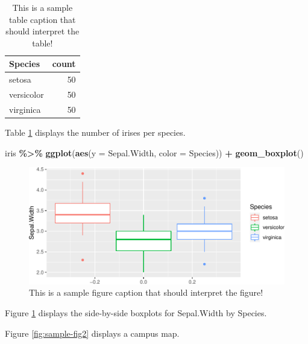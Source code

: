 \documentclass[12pt]{article}
\newenvironment{Shaded}{\begin{snugshade}}{\end{snugshade}}
\newcommand{\AttributeTok}[1]{\textcolor[rgb]{0.13,0.29,0.53}{#1}}
\newcommand{\FunctionTok}[1]{\textcolor[rgb]{0.13,0.29,0.53}{\textbf{#1}}}
\newcommand{\NormalTok}[1]{#1}
\newcommand{\SpecialCharTok}[1]{\textcolor[rgb]{0.81,0.36,0.00}{\textbf{#1}}}
\begin{document}
\begin{table}

\caption{\label{tab:sample-table1}This is a sample table caption that should interpret the table!}
\centering
\begin{tabular}[t]{l|r}
\hline
Species & count\\
\hline
setosa & 50\\
\hline
versicolor & 50\\
\hline
virginica & 50\\
\hline
\end{tabular}
\end{table}

Table \ref{tab:sample-table1} displays the number of irises per species.

\begin{Shaded}
\begin{Highlighting}[]
\NormalTok{iris }\SpecialCharTok{\%\textgreater{}\%} 
  \FunctionTok{ggplot}\NormalTok{(}\FunctionTok{aes}\NormalTok{(}\AttributeTok{y =}\NormalTok{ Sepal.Width, }\AttributeTok{color =}\NormalTok{ Species)) }\SpecialCharTok{+}
  \FunctionTok{geom\_boxplot}\NormalTok{()}
\end{Highlighting}
\end{Shaded}

\begin{figure}
\centering
\includegraphics{paper_files/figure-latex/sample-fig1-1.pdf}
\caption{\label{fig:sample-fig1}This is a sample figure caption that
should interpret the figure!}
\end{figure}

Figure \ref{fig:sample-fig1} displays the side-by-side boxplots for
Sepal.Width by Species.

Figure \ref{fig:sample-fig2} displays a campus map.
\end{document}
